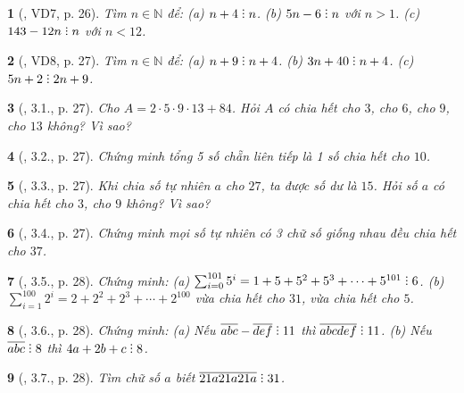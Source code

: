 \documentclass{article}
\newtheorem{baitoan}{}
\DeclareRobustCommand{\divby}{%
	\mathrel{\vbox{\baselineskip.65ex\lineskiplimit0pt\hbox{.}\hbox{.}\hbox{.}}}%
}
\begin{document}
\begin{baitoan}[\cite{Binh_boi_duong_Toan_6_tap_1}, VD7, p. 26]
	Tìm $n\in\mathbb{N}$ để: (a) $n + 4\divby n$. (b) $5n - 6\divby n$ với $n > 1$. (c) $143 - 12n\divby n$ với $n < 12$.
\end{baitoan}

\begin{baitoan}[\cite{Binh_boi_duong_Toan_6_tap_1}, VD8, p. 27]
	Tìm $n\in\mathbb{N}$ để: (a) $n + 9\divby n + 4$. (b) $3n + 40\divby n + 4$. (c) $5n + 2\divby2n + 9$.
\end{baitoan}

\begin{baitoan}[\cite{Binh_boi_duong_Toan_6_tap_1}, 3.1., p. 27]
	Cho $A = 2\cdot5\cdot9\cdot13 + 84$. Hỏi $A$ có chia hết cho $3$, cho $6$, cho $9$, cho $13$ không? Vì sao?
\end{baitoan}

\begin{baitoan}[\cite{Binh_boi_duong_Toan_6_tap_1}, 3.2., p. 27]
	Chứng minh tổng 5 số chẵn liên tiếp là 1 số chia hết cho $10$.
\end{baitoan}

\begin{baitoan}[\cite{Binh_boi_duong_Toan_6_tap_1}, 3.3., p. 27]
	Khi chia số tự nhiên $a$ cho $27$, ta được số dư là $15$. Hỏi số $a$ có chia hết cho $3$, cho $9$ không? Vì sao?
\end{baitoan}

\begin{baitoan}[\cite{Binh_boi_duong_Toan_6_tap_1}, 3.4., p. 27]
	Chứng minh mọi số tự nhiên có 3 chữ số giống nhau đều chia hết cho $37$.
\end{baitoan}

\begin{baitoan}[\cite{Binh_boi_duong_Toan_6_tap_1}, 3.5., p. 28]
	Chứng minh: (a) $\sum_{i=0}^{101} 5^i = 1 + 5 + 5^2 + 5^3 + \cdots + 5^{101}\divby6$. (b) $\sum_{i=1}^{100} 2^i = 2 + 2^2 + 2^3 + \cdots + 2^{100}$ vừa chia hết cho $31$, vừa chia hết cho $5$.
\end{baitoan}

\begin{baitoan}[\cite{Binh_boi_duong_Toan_6_tap_1}, 3.6., p. 28]
	Chứng minh: (a) Nếu $\overline{abc} - \overline{def}\divby11$ thì $\overline{abcdef}\divby11$. (b) Nếu $\overline{abc}\divby8$ thì $4a + 2b + c\divby8$.
\end{baitoan}

\begin{baitoan}[\cite{Binh_boi_duong_Toan_6_tap_1}, 3.7., p. 28]
	Tìm chữ số $a$ biết $\overline{21a21a21a}\divby31$.
\end{baitoan}
\end{document}
